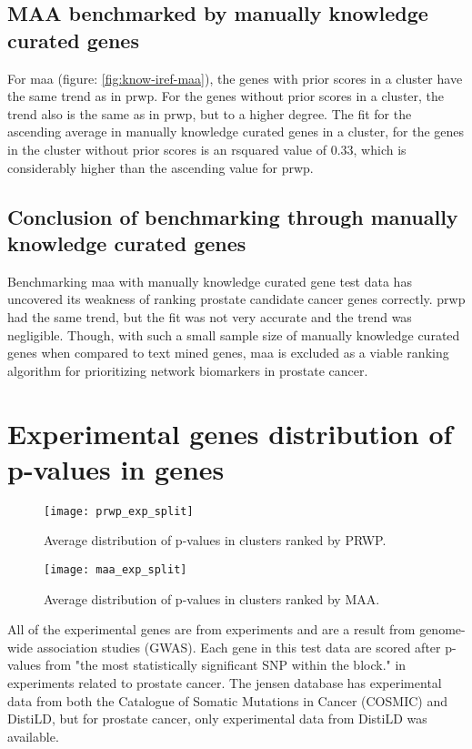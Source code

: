 \subsection{MAA benchmarked by manually knowledge curated genes}
For \gls{maa} (figure: \ref{fig:know-iref-maa}), the genes with prior scores in a
cluster have the same trend as in \gls{prwp}. For the genes without prior scores
in a cluster, the trend also is the same as in \gls{prwp}, but to a higher
degree. The fit for the ascending average in manually knowledge curated genes in
a cluster, for the genes in the cluster without prior scores is an
\gls{rsquared} value of 0.33, which is considerably higher than the ascending
value for \gls{prwp}.

\subsection{Conclusion of benchmarking through manually knowledge curated genes}
Benchmarking \gls{maa} with manually knowledge curated gene test data has
uncovered its weakness of ranking prostate candidate cancer genes correctly.
\gls{prwp} had the same trend, but the fit was not very accurate and the trend
was negligible. Though, with such a small sample size of manually knowledge
curated genes when compared to text mined genes, \gls{maa} is excluded as
a viable ranking algorithm for prioritizing network biomarkers in prostate
cancer.

\section{Experimental genes distribution of p-values in genes}
\begin{sidewaysfigure}
    \texttt{[image: prwp\_exp\_split]}
    \caption{Average distribution of p-values in clusters ranked by PRWP.}
    \label{fig:exp-iref-prwp}
\end{sidewaysfigure}
\begin{sidewaysfigure}
    \texttt{[image: maa\_exp\_split]}
    \caption{Average distribution of p-values in clusters ranked by MAA.}
    \label{fig:exp-iref-maa}
\end{sidewaysfigure}

All of the experimental genes are from experiments and are a result from
genome-wide association studies (GWAS). Each gene in this test data are scored
after p-values from "the most statistically significant SNP within the
block."\cite{distild} in experiments related to prostate cancer. The
\gls{jensen} database has experimental data from both the Catalogue of Somatic
Mutations in Cancer (COSMIC) and DistiLD, but for prostate cancer, only
experimental data from DistiLD was available.

